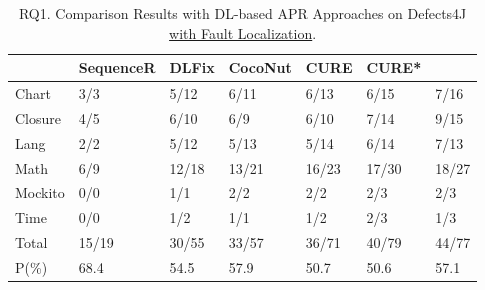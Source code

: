 \begin{table}[t]
  \caption{RQ1. Comparison Results with DL-based APR Approaches on Defects4J \underline {with Fault Localization}.}
  \vspace{-6pt}
  {\small
			\begin{center}
				\renewcommand{\arraystretch}{1}
				\begin{tabular}{p{0.8cm}<{\centering}|p{1.2cm}<{\centering}|p{0.9cm}<{\centering}|p{1cm}<{\centering}|p{0.8cm}<{\centering}|p{0.8cm}<{\centering}|p{0.8cm}<{\centering}}
					
					\hline
					&\textbf{SequenceR}&\textbf{DLFix}& \textbf{CocoNut}&\textbf{CURE}&\textbf{CURE*}&\textbf{\tool}\\
					\hline
					Chart  & 3/3   & 5/12  & 6/11  & 6/13  & 6/15 & 7/16\\
					Closure& 4/5   & 6/10  & 6/9   & 6/10  & 7/14 & 9/15\\
					Lang   & 2/2   & 5/12  & 5/13  & 5/14  & 6/14  & 7/13\\
					Math    & 6/9  & 12/18 & 13/21 & 16/23 & 17/30 & 18/27\\
					Mockito & 0/0   & 1/1   & 2/2   & 2/2  & 2/3  & 2/3\\
					Time    & 0/0   & 1/2   & 1/1   & 1/2  & 2/3  & 1/3\\
					\hline
					Total   & 15/19 & 30/55 & 33/57 & 36/71 & 40/79 & 44/77\\
					\hline
					P(\%)  & 68.4  & 54.5  & 57.9  & 50.7  & 50.6  & 57.1\\
					\hline
				\end{tabular}
				\label{RQ1_defects4J_with_FL}
			\end{center}
                }
		\end{table}

















